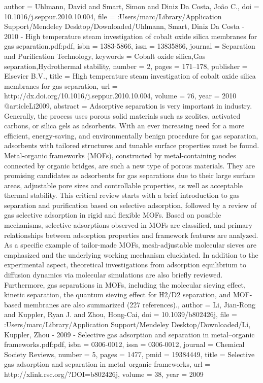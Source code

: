 {author = {Uhlmann, David and Smart, Simon and {Diniz Da Costa}, Jo{\~{a}}o C.},
doi = {10.1016/j.seppur.2010.10.004},
file = {:Users/marc/Library/Application Support/Mendeley Desktop/Downloaded/Uhlmann, Smart, Diniz Da Costa - 2010 - High temperature steam investigation of cobalt oxide silica membranes for gas separation.pdf:pdf},
isbn = {1383-5866},
issn = {13835866},
journal = {Separation and Purification Technology},
keywords = {Cobalt oxide silica,Gas separation,Hydrothermal stability},
number = {2},
pages = {171--178},
publisher = {Elsevier B.V.},
title = {{High temperature steam investigation of cobalt oxide silica membranes for gas separation}},
url = {http://dx.doi.org/10.1016/j.seppur.2010.10.004},
volume = {76},
year = {2010}
}
@article{Li2009,
abstract = {Adsorptive separation is very important in industry. Generally, the process uses porous solid materials such as zeolites, activated carbons, or silica gels as adsorbents. With an ever increasing need for a more efficient, energy-saving, and environmentally benign procedure for gas separation, adsorbents with tailored structures and tunable surface properties must be found. Metal-organic frameworks (MOFs), constructed by metal-containing nodes connected by organic bridges, are such a new type of porous materials. They are promising candidates as adsorbents for gas separations due to their large surface areas, adjustable pore sizes and controllable properties, as well as acceptable thermal stability. This critical review starts with a brief introduction to gas separation and purification based on selective adsorption, followed by a review of gas selective adsorption in rigid and flexible MOFs. Based on possible mechanisms, selective adsorptions observed in MOFs are classified, and primary relationships between adsorption properties and framework features are analyzed. As a specific example of tailor-made MOFs, mesh-adjustable molecular sieves are emphasized and the underlying working mechanism elucidated. In addition to the experimental aspect, theoretical investigations from adsorption equilibrium to diffusion dynamics via molecular simulations are also briefly reviewed. Furthermore, gas separations in MOFs, including the molecular sieving effect, kinetic separation, the quantum sieving effect for H2/D2 separation, and MOF-based membranes are also summarized (227 references).},
author = {Li, Jian-Rong and Kuppler, Ryan J. and Zhou, Hong-Cai},
doi = {10.1039/b802426j},
file = {:Users/marc/Library/Application Support/Mendeley Desktop/Downloaded/Li, Kuppler, Zhou - 2009 - Selective gas adsorption and separation in metal–organic frameworks.pdf:pdf},
isbn = {0306-0012},
issn = {0306-0012},
journal = {Chemical Society Reviews},
number = {5},
pages = {1477},
pmid = {19384449},
title = {{Selective gas adsorption and separation in metal–organic frameworks}},
url = {http://xlink.rsc.org/?DOI=b802426j},
volume = {38},
year = {2009}
}
